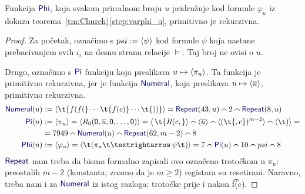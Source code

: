 \begin{lema}[{name=[primitivna rekurzivnost svođenja $K$ na $Valid$]}]
Funkcija $\f{Phi}$, koja svakom prirodnom broju $u$ pridružuje kod formule $\varphi_u$ iz dokaza teorema~\ref{tm:Church}\,\eqref{step:varphi_u}, primitivno je rekurzivna.
\end{lema}
\begin{proof}
    Za početak, označimo s $psi:=\langle\psi\rangle$ kod formule $\psi$ koja nastane prebacivanjem svih $\overline{\iota_i}$ na desnu stranu relacije $\models$. Taj broj ne ovisi o $u$.

Drugo, označimo s $\f{Pi}$ funkciju koja preslikava $u\mapsto\langle\pi_u\rangle$. Ta funkcija je primitivno rekurzivna, jer je funkcija $\f{Numeral}$, koja preslikava $u\mapsto\langle\overline u\rangle$, primitivno rekurzivna.
\begin{align}
    \f{Numeral}(u)&:=\kr{\t{f(f(}\dotsb\t{f(c)}\dotsm\t{))}}=\f{Repeat}(43,u)\conc{}2\conc{}\f{Repeat}(8,u)\\
    \f{Pi}(u)&:=\kr{\pi_u}=\kr{R_0(\mathsf0,\overline u,\mathsf0,\dotsc,\mathsf0)}=
    \kr{\,\t{R(c,}}\conc{}\kr{\overline u}\conc{}\kr{(\t{,c})^{m-2}}\conc{}\kr{\t)}=\notag\\
    &=7949\conc{}\f{Numeral}(u)\conc{}\f{Repeat}(62,m-2)\conc{}8\\
    \f{Phi}(u)&:=\kr{\varphi_u}=\kr{\t(\pi_u\!\,\t\textrightarrow\,\psi\t)}=7\conc{}\f{Pi}(u)\conc{}10\conc{}psi\conc{}8
\end{align}
    $\f{Repeat}$ nam treba da bismo formalno zapisali ovo označeno trotočkom u $\pi_u$: preostalih $m-2$ (konstanta; znamo da je $m\ge2$) registara su resetirani. Naravno, treba nam i za $\f{Numeral}$ iz istog razloga: trotočke prije i nakon \t{f(c)}.
\end{proof}

